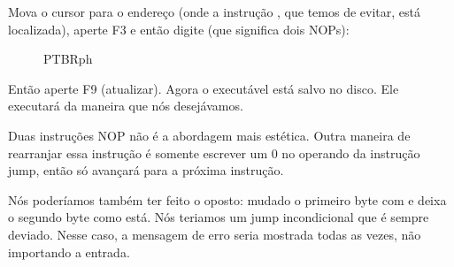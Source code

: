 \clearpage
Mova o cursor para o endereço  (onde a instrução , que temos de evitar, está localizada), aperte F3 e então digite  (que significa dois \ac{NOP}s):

\begin{figure}[H]
\centering
{}
\caption{PTBRph{}}
\label{fig:scanf_ex3_hiew_2}
\end{figure}

Então aperte F9 (atualizar). Agora o executável está salvo no disco. Ele executará da maneira que nós desejávamos.

Duas instruções \ac{NOP} não é a abordagem mais estética.
Outra maneira de rearranjar essa instrução é somente escrever um 0 no operando da instrução jump,
então  só avançará para a próxima instrução.

Nós poderíamos também ter feito o oposto: mudado o primeiro byte com  e deixa o segundo byte como está.
Nós teriamos um jump incondicional que é sempre deviado.
Nesse caso, a mensagem de erro seria mostrada todas as vezes, não importando a entrada.

